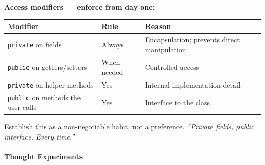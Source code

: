 \documentclass[
  justified,
  openright,
]{tufte-book}
\let\paragraph\paragraph
\let\paragraph\paragraph
\begin{document}
\textbf{Access modifiers --- enforce from day one:}

\begin{fullwidth}{\def\LTcaptype{none} %
\begin{longtable}[]{@{}
  >{\raggedright\arraybackslash}p{}
  >{\raggedright\arraybackslash}p{}
  >{\raggedright\arraybackslash}p{}@{}}
\toprule\noalign{}
\begin{minipage}[b]{\linewidth}\raggedright
Modifier
\end{minipage} & \begin{minipage}[b]{\linewidth}\raggedright
Rule
\end{minipage} & \begin{minipage}[b]{\linewidth}\raggedright
Reason
\end{minipage} \\
\midrule\noalign{}
\endhead
\bottomrule\noalign{}
\endlastfoot
\texttt{private} on fields & Always & Encapsulation; prevents direct
manipulation \\
\texttt{public} on getters/setters & When needed & Controlled access \\
\texttt{private} on helper methods & Yes & Internal implementation
detail \\
\texttt{public} on methods the user calls & Yes & Interface to the
class \\
\end{longtable}
}
\end{fullwidth}

Establish this as a non-negotiable habit, not a preference.
\emph{``Private fields, public interface. Every time.''}

\paragraph{Thought Experiments}\label{thought-experiments-39}
\end{document}
